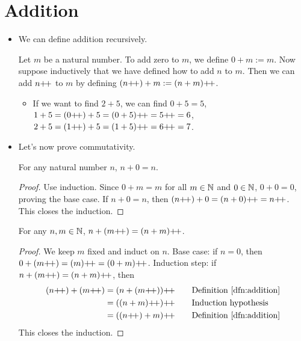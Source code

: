 \documentclass[../main.tex]{subfiles}
\begin{document}
\section{Addition}
\begin{itemize}
    \item We can define addition recursively.
    \begin{dfn}\label{dfn:addition}
        Let $m$ be a natural number. To add zero to $m$, we define $0+m:=m$. Now suppose inductively that we have defined how to add $n$ to $m$. Then we can add $n{+\!+}$ to $m$ by defining $(n{+\!+})+m:=(n+m){+\!+}$.
    \end{dfn}
    \begin{itemize}
        \item If we want to find $2+5$, we can find $0+5=5$, $1+5=(0{+\!+})+5=(0+5){+\!+}=5{+\!+}=6$, $2+5=(1{+\!+})+5=(1+5){+\!+}=6{+\!+}=7$.
    \end{itemize}
    \item Let's now prove commutativity.
    \begin{lem}\label{lem:nplus0}
        For any natural number $n$, $n+0=n$.
        \begin{proof}
            Use induction. Since $0+m=m$ for all $m\in\mathbb{N}$ and $0\in\mathbb{N}$, $0+0=0$, proving the base case. If $n+0=n$, then $(n{+\!+})+0=(n+0){+\!+}=n{+\!+}$. This closes the induction.
        \end{proof}
    \end{lem}
    \begin{lem}\label{lem:nplusmpplus}
        For any $n,m\in\mathbb{N}$, $n+(m{+\!+})=(n+m){+\!+}$.
        \begin{proof}
            We keep $m$ fixed and induct on $n$. Base case: if $n=0$, then $0+(m{+\!+})=(m){+\!+}=(0+m){+\!+}$. Induction step: if $n+(m{+\!+})=(n+m){+\!+}$, then
            \begin{align*}
                (n\pplus)+(m\pplus) &= (n+(m\pplus))\pplus\tag*{Definition \ref{dfn:addition}}\\
                &= ((n+m)\pplus)\pplus\tag*{Induction hypothesis}\\
                &= ((n\pplus)+m)\pplus\tag*{Definition \ref{dfn:addition}}
            \end{align*}
            This closes the induction.
        \end{proof}
    \end{lem}
    \begin{prp}\label{prp:commutativity}

\end{prp}
\end{itemize}
\end{document}
